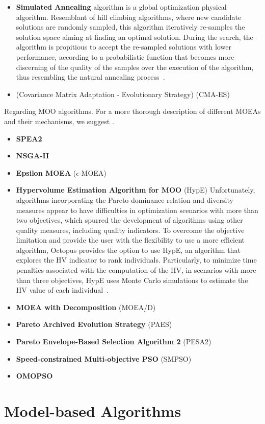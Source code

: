 \begin{itemize}
	\item \textbf{Simulated Annealing} algorithm is a global optimization physical algorithm. Resemblant of hill climbing algorithms, where new candidate solutions are randomly sampled, this algorithm iteratively re-samples the solution space aiming at finding an optimal solution. During the search, the algorithm is propitious to accept the re-sampled solutions with lower performance, according to a probabilistic function that becomes more discerning of the quality of the samples over the execution of the algorithm, thus resembling the natural annealing process~\cite{Brownlee2011}. 
	
	\item \textbf{} (Covariance Matrix Adaptation - Evolutionary Strategy) (CMA-ES) 
\end{itemize}

Regarding \ac{MOO} algorithms. 
For a more thorough description of different \acp{MOEA} and their mechanisms, we suggest \cite{Zhou2011}. 

\begin{itemize}
	\item \textbf{SPEA2}
	
	\item \textbf{NSGA-II}
	
	\item \textbf{Epsilon \ac{MOEA}} ($\epsilon$-MOEA) 
	
	\item \textbf{Hypervolume Estimation Algorithm for \ac{MOO}} (HypE) 
	Unfortunately, algorithms incorporating the Pareto dominance relation and diversity measures appear to have difficulties in optimization scenarios with more than two objectives, which spurred the development of algorithms using other quality measures, including quality indicators. To overcome the objective limitation and provide the user with the flexibility to use a more efficient algorithm, Octopus provides the option to use \ac{HypE}, an algorithm that explores the \ac{HV} indicator to rank individuals. Particularly, to minimize time penalties associated with the computation of the \ac{HV}, in scenarios with more than three objectives, \ac{HypE} uses Monte Carlo simulations to estimate the \ac{HV} value of each individual~\cite{Zitzler2011HypE}. 
	
	\item \textbf{\ac{MOEA} with Decomposition} (MOEA/D)
	
	\item \textbf{Pareto Archived Evolution Strategy} (PAES)
	
	\item \textbf{Pareto Envelope-Based Selection Algorithm 2} (PESA2)
	
	\item \textbf{Speed-constrained Multi-objective \ac{PSO}} (SMPSO)
	
	\item \textbf{OMOPSO}
	
\end{itemize}


\section{Model-based Algorithms}